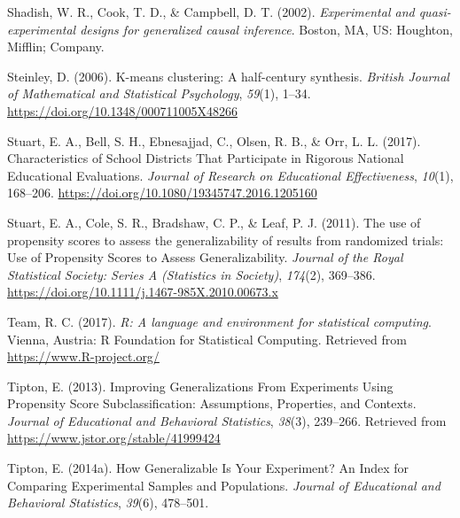 \documentclass[
  english,
  man,floatsintext]{apa6}
\newlength{\cslhangindent}
\newlength{\cslentryspacingunit} %
\newenvironment{CSLReferences}[2] %
 {%
  \setlength{\parindent}{0pt}
  \ifodd #1
  \let\oldpar\par
  \def\par{\hangindent=\cslhangindent\oldpar}
  \fi
  \setlength{\parskip}{#2\cslentryspacingunit}
 }%
 {}
\begin{document}
\begin{CSLReferences}{1}{0}
\leavevmode{}%
Shadish, W. R., Cook, T. D., \& Campbell, D. T. (2002). \emph{Experimental and quasi-experimental designs for generalized causal inference}. Boston, MA, US: Houghton, Mifflin; Company.

\leavevmode{}%
Steinley, D. (2006). K-means clustering: {A} half-century synthesis. \emph{British Journal of Mathematical and Statistical Psychology}, \emph{59}(1), 1--34. \url{https://doi.org/10.1348/000711005X48266}

\leavevmode{}%
Stuart, E. A., Bell, S. H., Ebnesajjad, C., Olsen, R. B., \& Orr, L. L. (2017). Characteristics of {School Districts That Participate} in {Rigorous National Educational Evaluations}. \emph{Journal of Research on Educational Effectiveness}, \emph{10}(1), 168--206. \url{https://doi.org/10.1080/19345747.2016.1205160}

\leavevmode{}%
Stuart, E. A., Cole, S. R., Bradshaw, C. P., \& Leaf, P. J. (2011). The use of propensity scores to assess the generalizability of results from randomized trials: {Use} of {Propensity Scores} to {Assess Generalizability}. \emph{Journal of the Royal Statistical Society: Series A (Statistics in Society)}, \emph{174}(2), 369--386. \url{https://doi.org/10.1111/j.1467-985X.2010.00673.x}

\leavevmode{}%
Team, R. C. (2017). \emph{R: A language and environment for statistical computing}. Vienna, Austria: R Foundation for Statistical Computing. Retrieved from \url{https://www.R-project.org/}

\leavevmode{}%
Tipton, E. (2013). Improving {Generalizations From Experiments Using Propensity Score Subclassification}: {Assumptions}, {Properties}, and {Contexts}. \emph{Journal of Educational and Behavioral Statistics}, \emph{38}(3), 239--266. Retrieved from \url{https://www.jstor.org/stable/41999424}

\leavevmode{}%
Tipton, E. (2014a). How {Generalizable Is Your Experiment}? {An Index} for {Comparing Experimental Samples} and {Populations}. \emph{Journal of Educational and Behavioral Statistics}, \emph{39}(6), 478--501.


\end{CSLReferences}
\end{document}
